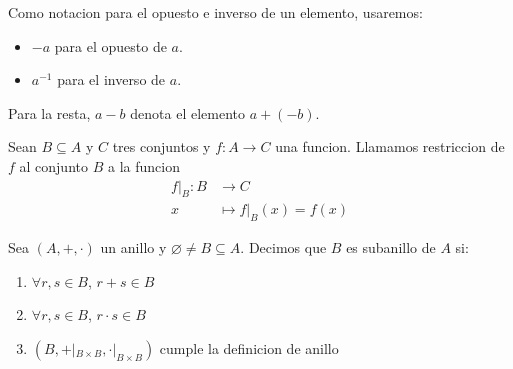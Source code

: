 \vspace{0.2cm}
Como notacion para el opuesto e inverso de un elemento, usaremos:
\begin{itemize}
	\item \(-a \) para el opuesto de \(a \).
	\item \(a^{-1} \) para el inverso de \(a \).
\end{itemize}

Para la resta, \(a-b \) denota el elemento \(a + (-b )\).


\begin{definition}
	Sean \(B \subseteq A \) y \(C \) tres conjuntos y \(f \colon A \to C \) una funcion. Llamamos restriccion de \(f \) al conjunto \(B \) a la funcion
	\[
		\begin{aligned}
			f|_B \colon B & \longrightarrow C             \\
			x             & \longmapsto f|_B (x ) = f(x)
		\end{aligned}
	\]
	
\end{definition}
\begin{definition}[Subanillo]
	Sea \((A,+,\cdot )\) un anillo y \(\varnothing \neq B \subseteq A \). Decimos que \(B \) es subanillo de \(A \) si:
	\begin{enumerate}
		\item \(\forall r,s \in B \), \(r+s \in B \)
		\item \(\forall r,s \in B\), \(r \cdot s \in B \)
		\item \((B, +|_{B \times B}, \cdot|_{B \times B })\) cumple la definicion de anillo
	\end{enumerate}
\end{definition}

